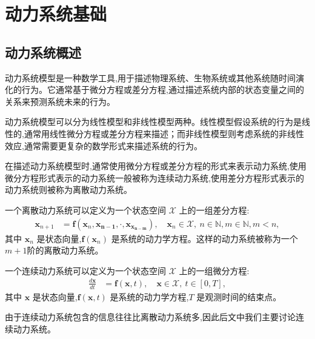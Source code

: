 \chapter{动力系统基础}\label{chap:dynamic}


\section{动力系统概述}
动力系统模型是一种数学工具,用于描述物理系统、生物系统或其他系统随时间演化的行为。它通常基于微分方程或差分方程,通过描述系统内部的状态变量之间的关系来预测系统未来的行为。

动力系统模型可以分为线性模型和非线性模型两种。线性模型假设系统的行为是线性的,通常用线性微分方程或差分方程来描述；而非线性模型则考虑系统的非线性效应,通常需要更复杂的数学形式来描述系统的行为。

在描述动力系统模型时,通常使用微分方程或差分方程的形式来表示动力系统,使用微分方程形式表示的动力系统一般被称为连续动力系统,使用差分方程形式表示的动力系统则被称为离散动力系统。
\begin{defn}[离散动力系统]
    一个离散动力系统可以定义为一个状态空间 $\mathcal{X}$ 上的一组差分方程:
    \begin{equation}\label{eq:discrete_dynamic_system}
        \begin{aligned}
            \mathbf{x}_{n+1} & = \mathbf{f}(\mathbf{x}_n,\mathbf{x_{n-1}},\cdot,\mathbf{x_{x_{n-m}}}), \quad \mathbf{x}_n \in \mathcal{X}, \ n \in \mathbb{N},m\in\mathbb{N},m<n,
        \end{aligned}
    \end{equation}
    其中 $\mathbf{x}_n$ 是状态向量,$\mathbf{f}(\mathbf{x}_n)$ 是系统的动力学方程。这样的动力系统被称为一个$m+1$阶的离散动力系统。
\end{defn}

\begin{defn}[连续动力系统]
    一个连续动力系统可以定义为一个状态空间 $\mathcal{X}$ 上的一组微分方程:
    \begin{equation}\label{eq:dynamic_system}
        \begin{aligned}
            \frac{d\mathbf{x}}{dt} & = \mathbf{f}(\mathbf{x}, t), \quad \mathbf{x} \in \mathcal{X}, \ t \in [0, T],
        \end{aligned}
    \end{equation}
    其中 $\mathbf{x}$ 是状态向量,$\mathbf{f}(\mathbf{x}, t)$ 是系统的动力学方程,$T$ 是观测时间的结束点。
\end{defn}

由于连续动力系统包含的信息往往比离散动力系统多,因此后文中我们主要讨论连续动力系统。

